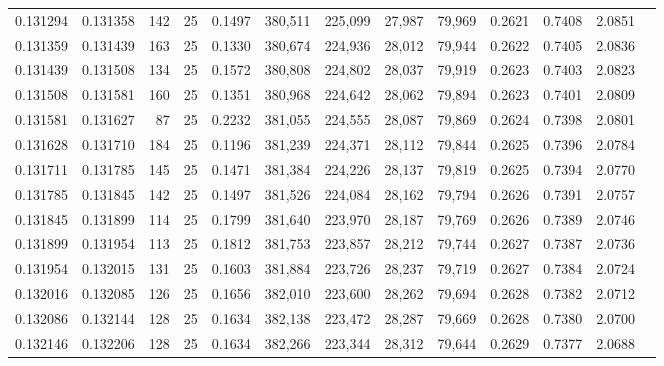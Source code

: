 \begin{tabular}{rrrrrrrrrrrrr}
0.131294 & 0.131358 &   142 &  25 &                                     0.1497 & 380,511 & 225,099 &  27,987 &  79,969 & 0.2621 & 0.7408 & 2.0851 \\
0.131359 & 0.131439 &   163 &  25 &                                     0.1330 & 380,674 & 224,936 &  28,012 &  79,944 & 0.2622 & 0.7405 & 2.0836 \\
0.131439 & 0.131508 &   134 &  25 &                                     0.1572 & 380,808 & 224,802 &  28,037 &  79,919 & 0.2623 & 0.7403 & 2.0823 \\
0.131508 & 0.131581 &   160 &  25 &                                     0.1351 & 380,968 & 224,642 &  28,062 &  79,894 & 0.2623 & 0.7401 & 2.0809 \\
0.131581 & 0.131627 &    87 &  25 &                                     0.2232 & 381,055 & 224,555 &  28,087 &  79,869 & 0.2624 & 0.7398 & 2.0801 \\
0.131628 & 0.131710 &   184 &  25 &                                     0.1196 & 381,239 & 224,371 &  28,112 &  79,844 & 0.2625 & 0.7396 & 2.0784 \\
0.131711 & 0.131785 &   145 &  25 &                                     0.1471 & 381,384 & 224,226 &  28,137 &  79,819 & 0.2625 & 0.7394 & 2.0770 \\
0.131785 & 0.131845 &   142 &  25 &                                     0.1497 & 381,526 & 224,084 &  28,162 &  79,794 & 0.2626 & 0.7391 & 2.0757 \\
0.131845 & 0.131899 &   114 &  25 &                                     0.1799 & 381,640 & 223,970 &  28,187 &  79,769 & 0.2626 & 0.7389 & 2.0746 \\
0.131899 & 0.131954 &   113 &  25 &                                     0.1812 & 381,753 & 223,857 &  28,212 &  79,744 & 0.2627 & 0.7387 & 2.0736 \\
0.131954 & 0.132015 &   131 &  25 &                                     0.1603 & 381,884 & 223,726 &  28,237 &  79,719 & 0.2627 & 0.7384 & 2.0724 \\
0.132016 & 0.132085 &   126 &  25 &                                     0.1656 & 382,010 & 223,600 &  28,262 &  79,694 & 0.2628 & 0.7382 & 2.0712 \\
0.132086 & 0.132144 &   128 &  25 &                                     0.1634 & 382,138 & 223,472 &  28,287 &  79,669 & 0.2628 & 0.7380 & 2.0700 \\
0.132146 & 0.132206 &   128 &  25 &                                     0.1634 & 382,266 & 223,344 &  28,312 &  79,644 & 0.2629 & 0.7377 & 2.0688 \\

\end{tabular}
